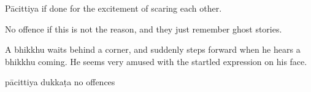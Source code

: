 \begin{exam}{\autoExamName}
\begin{problem*}
\begin{parts}
      \begin{solution}
        Pācittiya if done for the excitement of scaring each other.

        No offence if this is not the reason, and they just remember ghost stories.
      \end{solution}

      \bigskip

      \item A bhikkhu waits behind a corner, and suddenly steps forward when he
      hears a bhikkhu coming. He seems very amused with the startled expression
      on his face.

      \bigskip

      \begin{answers}{3}
        \bChoices
         pācittiya\eAns
         dukkaṭa\eAns
         no offences\eAns
        \eChoices
      \end{answers}

    \end{parts}

  \end{problem*}

\end{exam}
